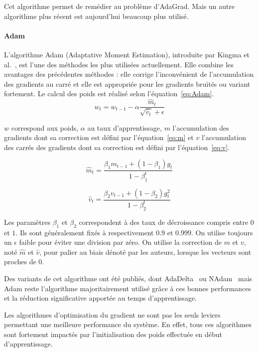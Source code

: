 Cet algorithme permet de remédier au problème d'AdaGrad. Mais un autre algorithme plus récent est aujourd'hui beaucoup plus utilisé.

\paragraph{Adam}
L'algorithme Adam (Adaptative Moment Estimation), introduite par Kingma et al.~\cite{Kingma2015}, est l'une des méthodes les plus utilisées actuellement. Elle combine les avantages des précédentes méthodes : elle corrige l'inconvénient de l'accumulation des gradients au carré et elle est appropriée pour les gradients bruités ou variant fortement. Le calcul des poids est réalisé selon l'équation~\ref{eq:Adam}.
\begin{equation}
  w_{t} = w_{t-1} - \alpha\frac{\hat{m}_{t}}{\sqrt{\hat{v}_{t}} + \epsilon}
  \label{eq:Adam}
\end{equation}

$w$ correspond aux poids, $\alpha$ au taux d'apprentissage, $m$ l'accumulation des gradients dont sa correction est défini par l'équation~\ref{eq:m} et $v$ l'accumulation des carrés des gradients dont sa correction est défini par l'équation~\ref{eq:v}.

\begin{equation}
  \hat{m}_{t} = \frac{\beta_{1}m_{t-1} + (1-\beta_{1})g_{t}}{1-\beta^{t}_{1}}
  \label{eq:m}
\end{equation}

\begin{equation}
  \hat{v}_{t} = \frac{\beta_{2}v_{t-1} + (1-\beta_{2})g_{t}^{2}}{1-\beta^{t}_{2}}
  \label{eq:v}
\end{equation}

Les paramètres $\beta_{1}$ et $\beta_{2}$ correspondent à des taux de décroissance compris entre $0$ et $1$. Ils sont généralement fixés à respectivement $0.9$ et $0.999$. On utilise toujours un $\epsilon$ faible pour éviter une division par zéro. On utilise la correction de $m$ et $v$, noté $\hat{m}$ et $\hat{v}$, pour palier au biais dénoté par les auteurs, lorsque les vecteurs sont proches de $0$.

Des variants de cet algorithme ont été publiés, dont AdaDelta~\cite{Zeiler2012} ou NAdam~\cite{Dozat2016} mais Adam reste l'algorithme majoritairement utilisé grâce à ces bonnes performances et la réduction significative apportée au temps d'apprentissage.

Les algorithmes d'optimisation du gradient ne sont pas les seuls leviers permettant une meilleure performance du système. En effet, tous ces algorithmes sont fortement impactés par l’initialisation des poids effectuée en début d'apprentissage.

